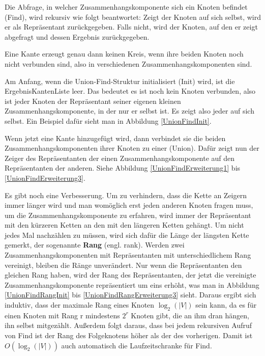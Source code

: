 Die Abfrage, in welcher Zusammenhangskomponente sich ein Knoten befindet (Find), wird rekursiv wie folgt beantwortet: 
Zeigt der Knoten auf sich selbst, wird er als Repräsentant zurückgegeben.
Falls nicht, wird der Knoten, auf den er zeigt abgefragt und dessen Ergebnis zurückgegeben.

Eine Kante erzeugt genau dann keinen Kreis, wenn ihre beiden Knoten noch nicht verbunden sind, also in verschiedenen Zusammenhangskomponenten sind.

Am Anfang, wenn die Union-Find-Struktur initialisiert (Init) wird, ist die ErgebnisKantenListe leer.
Das bedeutet es ist noch kein Knoten verbunden, also ist jeder Knoten der Repräsentant seiner eigenen kleinen Zusammenhangskomponente, in der nur er selbst ist.
Es zeigt also jeder auf sich selbst.
Ein Beispiel dafür sieht man in Abbildung \ref{UnionFindInit}.



Wenn jetzt eine Kante hinzugefügt wird, dann verbindet sie die beiden Zusammenhangskomponenten ihrer Knoten zu einer (Union).
Dafür zeigt nun der Zeiger des Repräsentanten der einen Zusammenhangskomponente auf den Repräsentanten der anderen.
Siehe Abbildung \ref{UnionFindErweiterung1} bis \ref{UnionFindErweiterung3}.



Es gibt noch eine Verbesserung.
Um zu verhindern, dass die Kette an Zeigern immer länger wird und man womöglich erst jeden anderen Knoten fragen muss, um die Zusammenhangskomponente zu erfahren,
wird immer der Repräsentant mit den kürzeren Ketten an den mit den längeren Ketten gehängt.
Um nicht jedes Mal nachzählen zu müssen, wird sich dafür die Länge der längsten Kette gemerkt, der sogenannte \textbf{Rang} (engl. rank).
Werden zwei Zusammenhangskomponenten mit Repräsentanten mit unterschiedlichem Rang vereinigt, bleiben die Ränge unverändert.
Nur wenn die Repräsentanten den gleichen Rang haben, wird der Rang des Repräsentanten, der jetzt die vereinigte Zusammenhangskomponente repräsentiert um eins erhöht,
was man in Abbildung \ref{UnionFindRangInit} bis \ref{UnionFindRangErweiterung3} sieht.
Daraus ergibt sich induktiv, dass der maximale Rang eines Knoten $\log_2(|V|)$ sein kann, da es für einen Knoten mit Rang r mindestens $2^r$ Knoten gibt, die an ihm dran hängen, ihn selbst mitgezählt.
Außerdem folgt daraus, dass bei jedem rekursiven Aufruf von Find ist der Rang des Folgeknotens höher als der des vorherigen.
Damit ist $O(\log_2(|V|))$ auch automatisch die Laufzeitschranke für Find.




